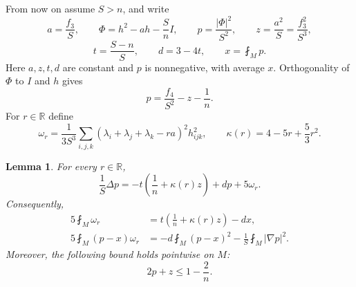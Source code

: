 \documentclass[10pt,a4paper]{amsart}
\numberwithin{equation}{section}
\newtheorem{lemma}[theorem]{Lemma}
\newcommand{\norm}[1]{\lvert #1\rvert}
\begin{document}
From now on assume $S>n$, and write
\begin{equation}\label{eq:basic-variables}
a=\frac{f_3}{S},\qquad
\Phi=h^2-ah-\frac Sn I,
\qquad
p=\frac{\norm\Phi^2}{S^2},
\qquad
z=\frac{a^2}{S}=\frac{f_3^2}{S^3},
\end{equation}
\[
t=\frac{S-n}{S},\qquad d=3-4t,
\qquad x=\fint_Mp.
\]
Here $a,z,t,d$ are constant and $p$ is nonnegative, with average $x$. Orthogonality of $\Phi$ to $I$ and $h$ gives
\begin{equation}\label{eq:p-formula}
p=\frac{f_4}{S^2}-z-\frac1n.
\end{equation}
For $r\in\mathbb R$ define
\begin{equation}\label{eq:omega-r}
\omega_r=
\frac1{3S^3}\sum_{i,j,k}
\left(\lambda_i+\lambda_j+\lambda_k-ra\right)^2h_{ijk}^2,
\qquad
\kappa(r)=4-5r+\frac53r^2.
\end{equation}

\begin{lemma}\label{lem:scalar}
For every $r\in\mathbb R$,
\begin{equation}\label{eq:scalar-defect}
\frac1S\Delta p
=-t\left(\frac1n+\kappa(r)z\right)+dp+5\omega_r.
\end{equation}
Consequently,
\begin{align}
5\fint_M\omega_r
&=t\left(\frac1n+\kappa(r)z\right)-dx,\label{eq:omega-average}\\
5\fint_M(p-x)\omega_r
&=-d\fint_M(p-x)^2-\frac1S\fint_M\norm{\nabla p}^2.
\label{eq:omega-cov}
\end{align}
Moreover, the following bound holds pointwise on $M$:
\begin{equation}\label{eq:moment-region}
2p+z\le1-\frac2n.
\end{equation}
\end{lemma}
\end{document}
